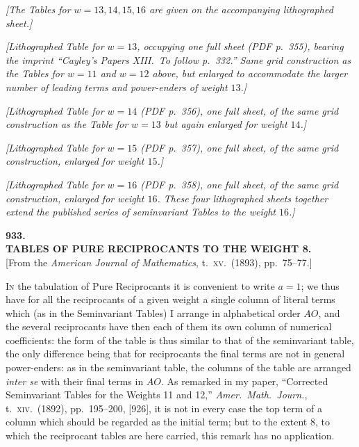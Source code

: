 \documentclass[11pt]{article}
\begin{document}
\noindent\textit{[The Tables for $w = 13, 14, 15, 16$ are given on the accompanying lithographed sheet.]}

\textit{[Lithographed Table for $w = 13$, occupying one full sheet (PDF p.\ 355), bearing the imprint ``Cayley's Papers XIII.\ To follow p.\ 332.'' Same grid construction as the Tables for $w = 11$ and $w = 12$ above, but enlarged to accommodate the larger number of leading terms and power-enders of weight $13$.]}

\bigskip
\textit{[Lithographed Table for $w = 14$ (PDF p.\ 356), one full sheet, of the same grid construction as the Table for $w = 13$ but again enlarged for weight $14$.]}

\bigskip
\textit{[Lithographed Table for $w = 15$ (PDF p.\ 357), one full sheet, of the same grid construction, enlarged for weight $15$.]}

\bigskip
\textit{[Lithographed Table for $w = 16$ (PDF p.\ 358), one full sheet, of the same grid construction, enlarged for weight $16$. These four lithographed sheets together extend the published series of seminvariant Tables to the weight $16$.]}

\clearpage
\begin{center}
{\large\bfseries 933.}\\[0.5em]
{\large\bfseries TABLES OF PURE RECIPROCANTS TO THE WEIGHT 8.}\\[0.5em]
{\small [From the \textit{American Journal of Mathematics}, t.\ \textsc{xv}.\ (1893), pp.\ 75--77.]}
\end{center}
\vspace{0.5em}

\textsc{In} the tabulation of Pure Reciprocants it is convenient to write $a = 1$; we thus have for all the reciprocants of a given weight a single column of literal terms which (as in the Seminvariant Tables) I arrange in alphabetical order $AO$, and the several reciprocants have then each of them its own column of numerical coefficients: the form of the table is thus similar to that of the seminvariant table, the only difference being that for reciprocants the final terms are not in general power-enders: as in the seminvariant table, the columns of the table are arranged \textit{inter se} with their final terms in $AO$.  As remarked in my paper, ``Corrected Seminvariant Tables for the Weights 11 and 12,'' \textit{Amer.\ Math.\ Journ.}, t.\ \textsc{xiv}.\ (1892), pp.\ 195--200, [926], it is not in every case the top term of a column which should be regarded as the initial term; but to the extent 8, to which the reciprocant tables are here carried, this remark has no application.
\end{document}
